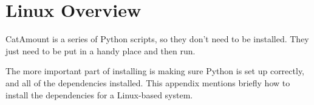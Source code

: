 \chapter{Linux Overview}
\hypertarget{linux-overview}{}

CatAmount is a series of Python scripts, so they don't need to be
installed. They just need to be put in a handy place and then run.

The more important part of installing is making sure Python is
set up correctly, and all of the dependencies installed. This
appendix mentions briefly how to install the dependencies for
a Linux-based system.

